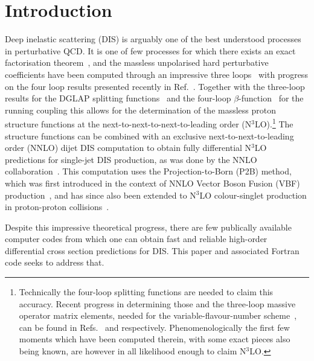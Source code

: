 \documentclass[submission, PhysCodeb]{SciPost_better_arXiv}
\newcommand{\nnlojet}{NNLO{\sc{jet}}}
\newcommand{\NNNLO}{N$^3$LO}
\begin{document}
\section{Introduction}
\label{sec:intro}
Deep inelastic scattering (DIS) is arguably one of the best understood
processes in perturbative QCD. It is one of few processes for which
there exists an exact factorisation
theorem~\cite{Collins:1987pm,Collins:1989gx}, and the massless
unpolarised hard perturbative coefficients have been computed through
an impressive three
loops~\cite{SanchezGuillen:1990iq,vanNeerven:1991nn,Zijlstra:1992qd,Zijlstra:1992kj,vanNeerven:1999ca,vanNeerven:2000uj,Moch:1999eb,Moch:2004xu,Vermaseren:2005qc,Vogt:2006bt,Moch:2007rq,Davies:2016ruz,Blumlein:2022gpp}
with progress on the four loop results presented recently in
Ref.~\cite{Moch:2022frw}. Together with the three-loop results for the
DGLAP splitting functions~\cite{Moch:2004pa,Vogt:2004mw,Blumlein:2021enk}
and the four-loop
$\beta$-function~\cite{vanRitbergen:1997va,Czakon:2004bu} for the
running coupling this allows for the determination of the massless
proton structure functions at the next-to-next-to-next-to-leading
order (\NNNLO{}).\footnote{\label{n3lo-note}Technically the four-loop
splitting functions are needed to claim this accuracy. Recent progress
in determining those and the three-loop massive operator matrix
elements, needed for the variable-flavour-number
scheme~\cite{Buza:1996wv}, can be found in
Refs.~\cite{Moch:2021qrk,Falcioni:2023luc,Falcioni:2023vqq,Gehrmann:2023cqm,Falcioni:2023tzp,Moch:2023tdj,Gehrmann:2023iah,Falcioni:2024xyt}
and
\cite{Bierenbaum:2009mv,Kawamura:2012cr,ABLINGER2014263,Ablinger:2014vwa,Ablinger:2014nga,Ablinger:2022wbb,Ablinger:2023ahe,Ablinger:2024xtt}
respectively. Phenomenologically the first few moments which have been
computed therein, with some exact pieces also being known, are however
in all likelihood enough to claim \NNNLO{}. } The structure functions
can be combined with an exclusive next-to-next-to-leading order (NNLO)
dijet DIS computation to obtain fully differential \NNNLO{}
predictions for single-jet DIS production, as was done by the
\nnlojet{}
collaboration~\cite{Currie:2016ytq,Currie:2018fgr,Gehrmann:2018odt}. This
computation uses the Projection-to-Born (P2B) method, which was first
introduced in the context of NNLO Vector Boson Fusion (VBF)
production~\cite{Cacciari:2015jma}, and has since also been extended
to \NNNLO{} colour-singlet production in proton-proton
collisions~\cite{Chen:2021isd,Chen:2021vtu}.

Despite this impressive theoretical progress, there are few publically
available computer codes from which one can obtain fast and reliable
high-order differential cross section predictions for DIS. This paper
and associated Fortran code seeks to address that.
\end{document}
